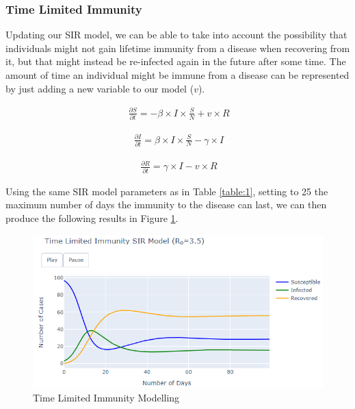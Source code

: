 \subsubsection{Time Limited Immunity}

Updating our SIR model, we can be able to take into account the possibility that individuals might not gain lifetime immunity from a disease when recovering from it, but that might instead be re-infected again in the future after some time. The amount of time an individual might be immune from a disease can be represented by just adding a new variable to our model ($v$).

\useshortskip
\begin{align}
\ \frac{\partial S}{\partial t} = -\beta \times I \times \frac{S}{N} + v \times R
\end{align}
\useshortskip

\useshortskip
\begin{align}
\ \frac{\partial I}{\partial t} = \beta \times I \times \frac{S}{N} -\gamma \times I
\end{align}
\useshortskip

\useshortskip
\begin{align}
\ \frac{\partial R}{\partial t} = \gamma \times I - v \times R
\end{align}
\useshortskip

Using the same SIR model parameters as in Table \ref{table:1}, setting to 25 the maximum number of days the immunity to the disease can last, we can then produce the following results in Figure \ref{low_imm}.

\begin{figure}[ht!]%
    \centering
    \includegraphics[width=13cm]{latex/images/time_lim.PNG}%
    \caption{Time Limited Immunity Modelling}
    \label{low_imm}
\end{figure}

